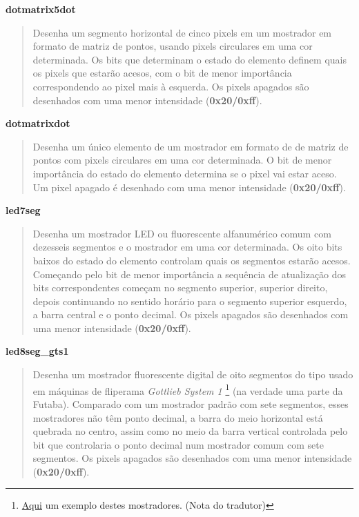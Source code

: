 \documentclass[letterpaper,10pt,brazil]{sphinxmanual}
\begin{document}
\textbf{dotmatrix5dot}
\begin{quote}

Desenha um segmento horizontal de cinco pixels em um mostrador em
formato de matriz de pontos, usando pixels circulares em uma cor
determinada. Os bits que determinam o estado do elemento definem
quais os pixels que estarão acesos, com o bit de menor importância
correspondendo ao pixel mais à esquerda. Os pixels apagados são
desenhados com uma menor intensidade (\textbf{0x20/0xff}).
\end{quote}

\textbf{dotmatrixdot}
\begin{quote}

Desenha um único elemento de um mostrador em formato de de matriz de
pontos com pixels circulares em uma cor determinada. O bit de menor
importância do estado do elemento determina se o pixel vai estar
aceso. Um pixel apagado é desenhado com uma menor intensidade
(\textbf{0x20/0xff}).
\end{quote}

\textbf{led7seg}
\begin{quote}

Desenha um mostrador LED ou fluorescente alfanumérico comum com
dezesseis segmentos e o mostrador em uma cor determinada. Os oito bits
baixos do estado do elemento controlam quais os segmentos estarão
acesos. Começando pelo bit de menor importância a sequência de
atualização dos bits correspondentes começam no segmento superior,
superior direito, depois continuando no sentido horário para o
segmento superior esquerdo, a barra central e o ponto decimal.
Os pixels apagados são desenhados com uma menor intensidade
(\textbf{0x20/0xff}).
\end{quote}

\textbf{led8seg\_gts1}
\begin{quote}

Desenha um mostrador fluorescente digital de oito segmentos do tipo
usado em máquinas de fliperama \emph{Gottlieb System 1} \footnote[8]{\sphinxAtStartFootnote%
\href{https://www.youtube.com/watch?v=-rrP4Prx1rc}{Aqui} um exemplo
destes mostradores. (Nota do tradutor)
} (na verdade uma
parte da Futaba). Comparado com um mostrador padrão
com sete segmentos, esses mostradores não têm ponto decimal, a barra
do meio horizontal está quebrada no centro, assim como no meio da
barra vertical controlada pelo bit que controlaria o ponto decimal
num mostrador comum com sete segmentos. Os pixels apagados são
desenhados com uma menor intensidade (\textbf{0x20/0xff}).
\end{quote}
\end{document}
